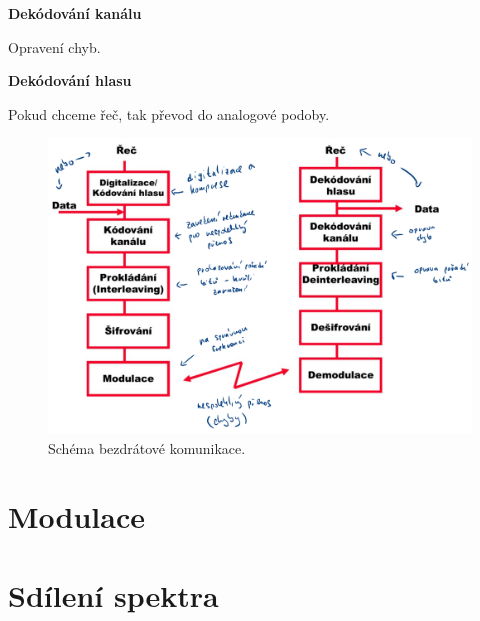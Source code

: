\begin{compactenum}
    \item \textbf{Dekódování kanálu} \begin{compactitem}
        \item Opravení chyb.
    \end{compactitem}

    \item \textbf{Dekódování hlasu} \begin{compactitem}
        \item Pokud chceme řeč, tak převod do analogové podoby.
    \end{compactitem}
\end{compactenum}

\begin{figure}[H]
    \centering
    \includegraphics[width=1\linewidth]{bezdratova_komunikace.pdf}
    \caption{Schéma bezdrátové komunikace.}
\end{figure}


\section{Modulace}



\section{Sdílení spektra}

